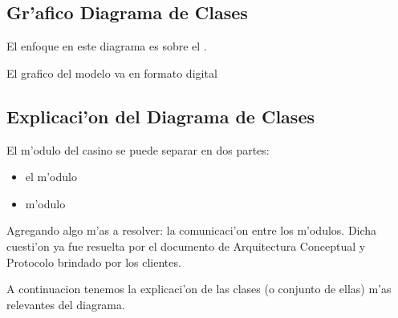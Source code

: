 \subsection{Gr'afico Diagrama de Clases}

El enfoque en este diagrama es sobre el .

El grafico del modelo va en formato digital

% 

% 
% 

\clearpage

\subsection{Explicaci'on del Diagrama de Clases}

El m'odulo del casino se puede separar en dos partes: 

\begin{itemize}
\item el m'odulo  
\item m'odulo 
\end{itemize}  

Agregando algo m'as a resolver: la comunicaci'on entre los m'odulos. Dicha cuesti'on ya fue resuelta por el documento de Arquitectura Conceptual y Protocolo brindado por los clientes.

A continuacion tenemos la explicaci'on de las clases (o conjunto de ellas) m'as relevantes del diagrama.

